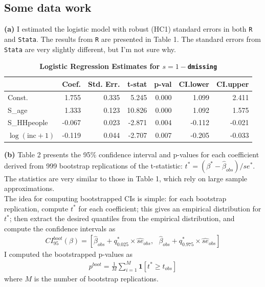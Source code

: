 \documentclass[12pt]{article}
\begin{document}
\subsection{Some data work}

\textbf{(a)} I estimated the logistic model with robust (HC1) standard errors in both \verb|R| and \verb|Stata|. The results from \verb|R| are presented in Table 1. The standard errors from \verb|Stata| are very slightly different, but I'm not sure why.

\begin{table}[!htpb]
\centering
\caption{\textbf{Logistic Regression Estimates for $s=1-$\texttt{dmissing}}}
\begin{tabular}{lrrrrrr}
  \hline
 & Coef. & Std. Err. & t-stat & p-val & CI.lower & CI.upper \\ 
  \hline
Const. & 1.755 & 0.335 & 5.245 & 0.000 & 1.099 & 2.411 \\ 
  S\_age & 1.333 & 0.123 & 10.826 & 0.000 & 1.092 & 1.575 \\ 
  S\_HHpeople & -0.067 & 0.023 & -2.871 & 0.004 & -0.112 & -0.021 \\ 
  $\log(\text{inc}+1)$ & -0.119 & 0.044 & -2.707 & 0.007 & -0.205 & -0.033 \\ 
   \hline
\end{tabular}
\end{table}

\textbf{(b)} Table 2 presents the 95\% confidence interval and p-values for each coefficient derived from 999 bootstrap replications of the t-statistic: $t^*=({\beta^*}-\hat{\beta}_{obs})/se^*$. The statistics are very similar to those in Table 1, which rely on large sample approximations. \\

The idea for computing bootstrapped CIs is simple: for each bootstrap replication, compute $t^*$ for each coefficient; this gives an empirical distribution for $t^*$; then extract the desired quantiles from the empirical distribution, and compute the confidence intervals as
\begin{align*}
CI^{boot}_{95}(\beta) = \left[ \hat{\beta}_{obs} +q^*_{0.025}\times \hat{se}_{obs},\text{ } \hat{\beta}_{obs} +q^*_{0.975}\times \hat{se}_{obs} \right]
\end{align*}
I computed the bootstrapped p-values as 
\begin{align*}
p^{boot} = \frac{1}{M}\sum_{i=1}^M \bm{1}[t^* \geq t_{obs}]
\end{align*}
where $M$ is the number of bootstrap replications.
\end{document}
